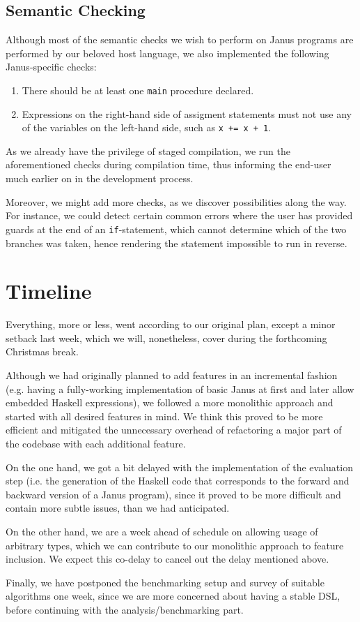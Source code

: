 \documentclass[12pt,a4paper]{article}
\newcommand{\code}[1]{\texttt{#1}}
\begin{document}
\subsection{Semantic Checking}
Although most of the semantic checks we wish to perform on Janus programs are performed by our beloved host language, we also implemented the following Janus-specific checks:
\begin{enumerate}
\item There should be at least one \code{main} procedure declared.
\item Expressions on the right-hand side of assigment statements must not use any of the variables on the left-hand side, such as \code{x += x + 1}.
\end{enumerate}
As we already have the privilege of staged compilation, we run the aforementioned checks during compilation time, thus informing the end-user much earlier on in the development process.

Moreover, we might add more checks, as we discover possibilities along the way. For instance, we could detect certain common errors where the user has provided guards at the end of an \code{if}-statement, which cannot determine which of the two branches was taken, hence rendering the statement impossible to run in reverse.

\section{Timeline}
Everything, more or less, went according to our original plan, except a minor setback last week, which we will, nonetheless, cover during the forthcoming Christmas break.

Although we had originally planned to add features in an incremental fashion (e.g. having a fully-working implementation of basic Janus at first and later allow embedded Haskell expressions), we followed a more monolithic approach and started with all desired features in mind. We think this proved to be more efficient and mitigated the unnecessary overhead of refactoring a major part of the codebase with each additional feature.

On the one hand, we got a bit delayed with the implementation of the evaluation step (i.e. the generation of the Haskell code that corresponds to the forward and backward version of a Janus program), since it proved to be more difficult and contain more subtle issues, than we had anticipated.

On the other hand, we are a week ahead of schedule on allowing usage of arbitrary types, which we can contribute to our monolithic approach to feature inclusion. We expect this co-delay to cancel out the delay mentioned above.

Finally, we have postponed the benchmarking setup and survey of suitable algorithms one week, since we are more concerned about having a stable DSL, before continuing with the analysis/benchmarking part.

\newpage



\end{document}
